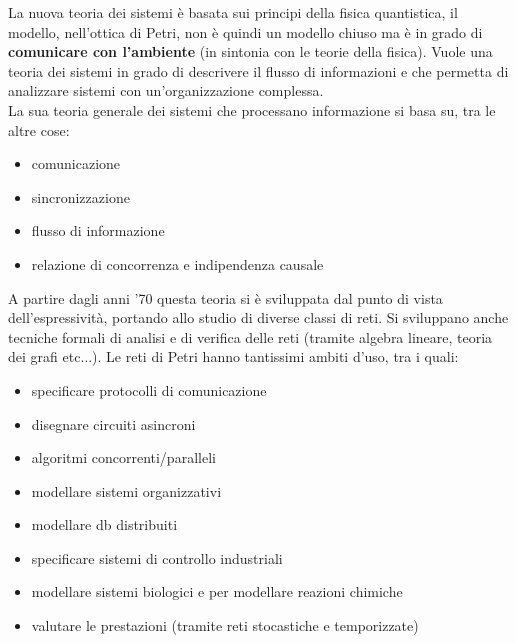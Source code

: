 La nuova teoria dei sistemi è basata sui principi della fisica quantistica, il
modello, nell’ottica di Petri, non è quindi un modello chiuso ma è 
in grado di \textbf{comunicare con l’ambiente} (in sintonia con le teorie della
fisica). Vuole una teoria dei sistemi in grado di descrivere il flusso di
informazioni e che permetta di analizzare sistemi con un'organizzazione
complessa.\\
La sua teoria generale dei sistemi che processano informazione si basa su, tra
le altre cose:
\begin{itemize}
  \item comunicazione
  \item sincronizzazione
  \item flusso di informazione
  \item relazione di concorrenza e indipendenza causale
\end{itemize}
A partire dagli anni '70 questa teoria si è sviluppata dal punto di vista
dell'espressività, portando allo studio di diverse classi di reti. Si sviluppano
anche tecniche formali di analisi e di verifica delle reti (tramite algebra
lineare, teoria dei grafi etc$\ldots$). Le reti di Petri hanno tantissimi ambiti
d'uso, tra i quali:
\begin{itemize}
  \item specificare protocolli di comunicazione
  \item disegnare circuiti asincroni
  \item algoritmi concorrenti/paralleli
  \item modellare sistemi organizzativi
  \item modellare db distribuiti
  \item specificare sistemi di controllo industriali
  \item modellare sistemi biologici e per modellare reazioni chimiche
  \item valutare le prestazioni (tramite reti stocastiche e temporizzate)
\end{itemize}
